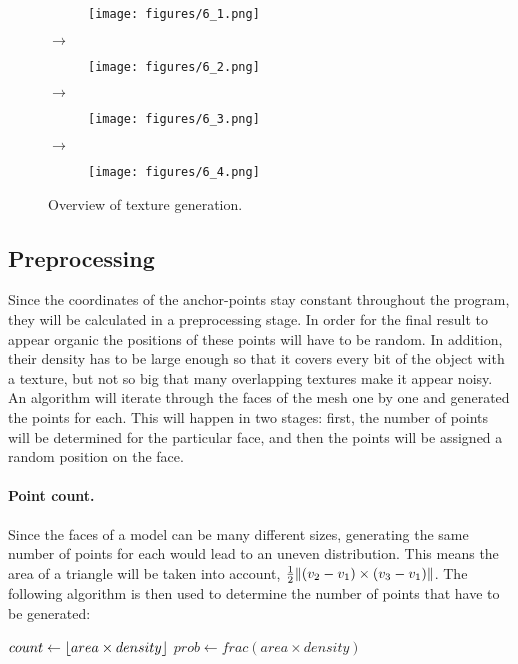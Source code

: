 \documentclass[a4paper, 12pt]{article}
\DeclarePairedDelimiter{\norm}{\lVert}{\rVert}
\DeclarePairedDelimiter{\floor}{\lfloor}{\rfloor}
\begin{document}
\begin{figure}[htbp!]
  \centering
  \begin{subfigure}{0.2\columnwidth}
    \texttt{[image: figures/6\_1.png]}
  \end{subfigure}%
  $\bm{\rightarrow}$%
  \begin{subfigure}{0.2\columnwidth}
    \texttt{[image: figures/6\_2.png]}
  \end{subfigure}%
  $\bm{\rightarrow}$%
  \begin{subfigure}{0.2\columnwidth}
    \texttt{[image: figures/6\_3.png]}
  \end{subfigure}%
  $\bm{\rightarrow}$%
  \begin{subfigure}{0.2\columnwidth}
    \texttt{[image: figures/6\_4.png]}
  \end{subfigure}
  \caption{Overview of texture generation.}
\end{figure}


\subsection{Preprocessing}
Since the coordinates of the anchor-points stay constant throughout the program, they will be calculated in a preprocessing stage. In order for the final result to appear organic the positions of these points will have to be random. In addition, their density has to be large enough so that it covers every bit of the object with a texture, but not so big that many overlapping textures make it appear noisy. An algorithm will iterate through the faces of the mesh one by one and generated the points for each. This will happen in two stages: first, the number of points will be determined for the particular face, and then the points will be assigned a random position on the face.

\paragraph{Point count.}
Since the faces of a model can be many different sizes, generating the same number of points for each would lead to an uneven distribution. This means the area of a triangle will be taken into account, $\frac{1}{2}\norm{(v_2-v_1) \times (v_3-v_1)}$. The following algorithm is then used to determine the number of points that have to be generated:

\begin{algorithm}[H]
$count \leftarrow \floor{area \times density}$\;
$prob \leftarrow frac(area \times density)$ 
\end{algorithm}
\end{document}
